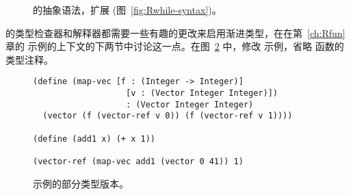 \documentclass[11pt]{book}
\newcommand{\gray}[1]{{\color{gray} #1}}
\begin{document}
\begin{figure}[tp]
\centering
\fbox{
  \begin{minipage}{0.96\textwidth}
    \small
\[
\begin{array}{lcl}
  \itm{param} &::=& \Var \mid \LS\Var \key{:} \Type\RS \\
  \Exp &::=& \gray{ \INT{\Int} \VAR{\Var} \mid \LET{\Var}{\Exp}{\Exp} } \\
       &\mid& \gray{ \PRIM{\itm{op}}{\Exp\ldots} }\\
     &\mid& \gray{ \BOOL{\itm{bool}}
      \mid \IF{\Exp}{\Exp}{\Exp} } \\
     &\mid& \gray{ \VOID{} \mid \LP\key{HasType}~\Exp~\Type \RP 
     \mid \APPLY{\Exp}{\Exp\ldots} }\\
  &\mid& \LAMBDA{\LP\itm{param}\ldots\RP}{\Type}{\Exp} \\
  &\mid& \gray{ \SETBANG{\Var}{\Exp} \mid \BEGIN{\LP\Exp\ldots\RP}{\Exp} } \\
  &\mid& \gray{ \WHILE{\Exp}{\Exp} } \\
 \Def &::=& \FUNDEF{\Var}{\LP\itm{param}\ldots\RP}{\Type}{\code{'()}}{\Exp} \\
  \LangGrad{} &::=& \gray{ \PROGRAMDEFSEXP{\code{'()}}{\LP\Def\ldots\RP}{\Exp} }
\end{array}
\]
\end{minipage}
}
\caption{ \LangGrad{} 的抽象语法，扩展 \LangLoop{} (图~\ref{fig:Rwhile-syntax})。}
\label{fig:Rgrad-syntax}
\end{figure}



 \LangGrad{} 的类型检查器和解释器都需要一些有趣的更改来启用渐进类型，在在第~\ref{ch:Rfun} 章的  示例的上下文的下两节中讨论这一点。在图~\ref{fig:gradual-map-vec} 中，修改  示例，省略  函数的类型注释。

\begin{figure}[btp]
\begin{lstlisting}
(define (map-vec [f : (Integer -> Integer)]
                   [v : (Vector Integer Integer)])
                   : (Vector Integer Integer)
  (vector (f (vector-ref v 0)) (f (vector-ref v 1))))

(define (add1 x) (+ x 1))

(vector-ref (map-vec add1 (vector 0 41)) 1)
\end{lstlisting}
\caption{  示例的部分类型版本。}
\label{fig:gradual-map-vec}
\end{figure}
\end{document}
